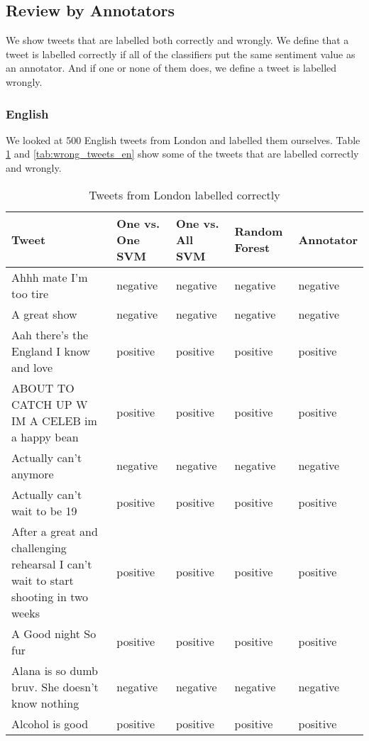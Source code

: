 \subsection{Review by Annotators}
We show tweets that are labelled both correctly and wrongly.
We define that a tweet is labelled correctly if all of the classifiers put the same sentiment value as an annotator.
And if one or none of them does, we define a tweet is labelled wrongly.
\subsubsection{English}
We looked at 500 English tweets from London and labelled them ourselves.
Table \ref{tab:correct_tweets_en} and \ref{tab:wrong_tweets_en} show some of the tweets that are labelled correctly and wrongly.

\begin{table}[ht]
	\caption{Tweets from London labelled correctly}
	\begin{tabular}{|p{5cm}|p{1.8cm}|p{1.8cm}|p{1.8cm}|p{1.8cm}|} \hline
	Tweet & One vs. One SVM &One vs. All SVM &Random Forest & Annotator\\ \hline
	Ahhh mate I'm too tire & negative & negative & negative & negative \\ \hline
	A great show & negative & negative & negative & negative \\ \hline
	 Aah there's the England I know and love  & positive& positive& positive& positive \\ \hline
	ABOUT TO CATCH UP W IM A CELEB im a happy bean & positive & positive & positive& positive \\ \hline
	Actually can't anymore  & negative& negative& negative& negative \\ \hline

	Actually can't wait to be 19 & positive& positive& positive& positive \\ \hline
	After a great and challenging rehearsal I can't wait to start shooting in two weeks & positive & positive & positive &positive \\ \hline
	A Good night So fur & positive& positive& positive& positive \\ \hline
	Alana is so dumb bruv. She doesn't know nothing & negative & negative& negative& negative\\ \hline
	Alcohol is good & positive& positive& positive& positive\\ \hline



	\end{tabular}
	\label{tab:correct_tweets_en}
\end{table}


